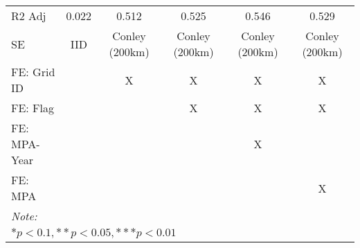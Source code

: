 \begin{table}
\begin{tabular}[t]{lccccc}
\hspace{1em}R2 Adj & 0.022 & 0.512 & 0.525 & 0.546 & 0.529\\
\hspace{1em}SE & IID & Conley (200km) & Conley (200km) & Conley (200km) & Conley (200km)\\
\midrule
FE: Grid ID &  & X & X & X & X\\
FE: Flag &  &  & X & X & X\\
FE: MPA-Year &  &  &  & X & \\
FE: MPA &  &  &  &  & X\\
\midrule
\bottomrule
\multicolumn{6}{l}{\rule{0pt}{1em}\textit{Note: }}\\
\multicolumn{6}{l}{\rule{0pt}{1em}$* p < 0.1, ** p < 0.05, *** p < 0.01$}\\
\end{tabular}
\end{table}